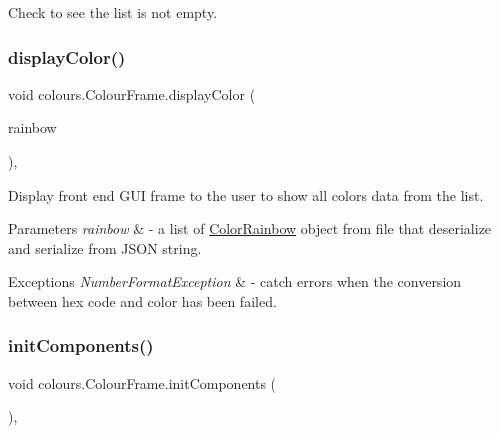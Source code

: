 Check to see the list is not empty. \mbox{\label{classcolours_1_1_colour_frame_a97c8597f65a97de8993a1ab05d39dd44}} 
\subsubsection{\texorpdfstring{display\+Color()}{displayColor()}}
{\footnotesize\ttfamily void colours.\+Colour\+Frame.\+display\+Color (\begin{DoxyParamCaption}\item[{List$<$ \hyperlink{classcolours_1_1_color_rainbow}{Color\+Rainbow} $>$}]{rainbow }\end{DoxyParamCaption})\hspace{0.3cm}{\ttfamily [inline]}, {\ttfamily [private]}}

Display front end G\+UI frame to the user to show all colors data from the list. 
\begin{DoxyParams}{Parameters}
{\em rainbow} & -\/ a list of \hyperlink{classcolours_1_1_color_rainbow}{Color\+Rainbow} object from file that deserialize and serialize from J\+S\+ON string. \\
\hline
\end{DoxyParams}

\begin{DoxyExceptions}{Exceptions}
{\em Number\+Format\+Exception} & -\/ catch errors when the conversion between hex code and color has been failed. \\
\hline
\end{DoxyExceptions}
\mbox{\label{classcolours_1_1_colour_frame_aa654076ec5e365557e85b7ba8e3dae47}} 
\subsubsection{\texorpdfstring{init\+Components()}{initComponents()}}
{\footnotesize\ttfamily void colours.\+Colour\+Frame.\+init\+Components (\begin{DoxyParamCaption}{ }\end{DoxyParamCaption})\hspace{0.3cm}{\ttfamily [inline]}, {\ttfamily [private]}}

